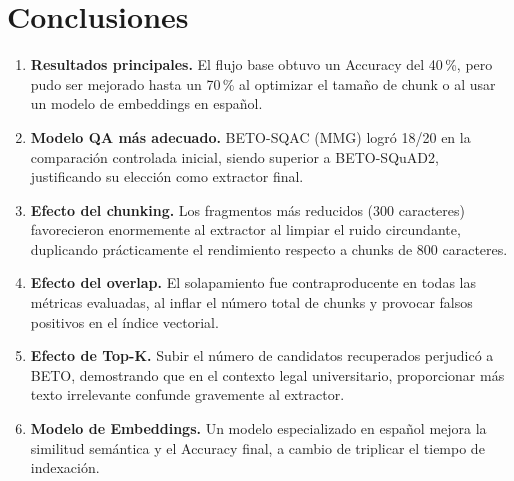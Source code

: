 \documentclass[12pt,letterpaper]{article}
\begin{document}
\section{Conclusiones}

\begin{enumerate}
  \item \textbf{Resultados principales.} El flujo base obtuvo un Accuracy del 40\,\%, pero pudo ser mejorado hasta un 70\,\% al optimizar el tamaño de chunk o al usar un modelo de embeddings en español.
  \item \textbf{Modelo QA más adecuado.} BETO-SQAC (MMG) logró 18/20 en la comparación controlada inicial, siendo superior a BETO-SQuAD2, justificando su elección como extractor final.
  \item \textbf{Efecto del chunking.} Los fragmentos más reducidos (300 caracteres) favorecieron enormemente al extractor al limpiar el ruido circundante, duplicando prácticamente el rendimiento respecto a chunks de 800 caracteres.
  \item \textbf{Efecto del overlap.} El solapamiento fue contraproducente en todas las métricas evaluadas, al inflar el número total de chunks y provocar falsos positivos en el índice vectorial.
  \item \textbf{Efecto de Top-K.} Subir el número de candidatos recuperados perjudicó a BETO, demostrando que en el contexto legal universitario, proporcionar más texto irrelevante confunde gravemente al extractor.
  \item \textbf{Modelo de Embeddings.} Un modelo especializado en español mejora la similitud semántica y el Accuracy final, a cambio de triplicar el tiempo de indexación.
\end{enumerate}
\end{document}
